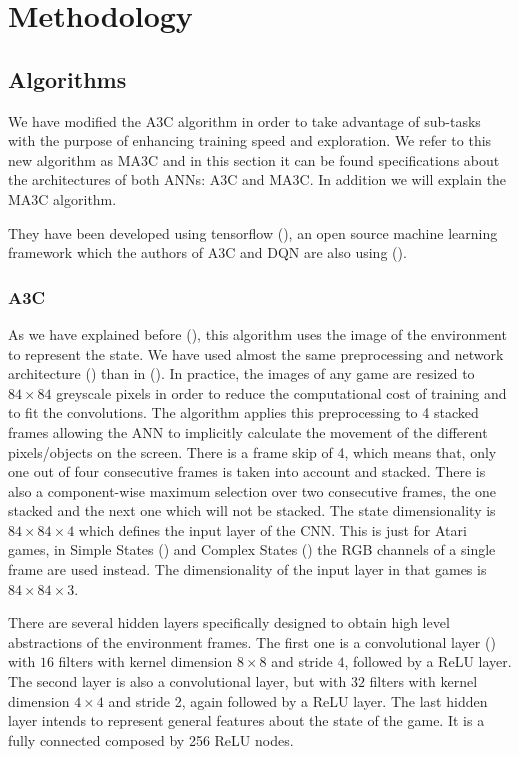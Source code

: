 \chapter{Methodology}

\section{Algorithms}

We have modified the \ac{A3C} algorithm in order to take advantage of sub-tasks with the purpose of enhancing training speed
and exploration.
We refer to this new algorithm as \acf{MA3C} and in this section it can be found specifications about the architectures of
both \acp{ANN}: \ac{A3C} and \ac{MA3C}.
In addition we will explain the \ac{MA3C} algorithm.

They have been developed using tensorflow (\cite{tensorflow2015}), an open source machine learning framework which the authors
of \ac{A3C} and \ac{DQN} are also using (\cite{deepmind_tensorflow}).

\subsection{\acl{A3C}\label{subsec:AlgorithmA3C}}

As we have explained before (), this algorithm uses the image of the environment to represent the state.
We have used almost the same preprocessing and network architecture () than in  (\cite{mnih2016A3C}).
In practice, the images of any game are resized to $84 \times 84$ greyscale pixels in order to reduce the computational cost of training and to fit the convolutions.
The algorithm applies this preprocessing to 4 stacked frames allowing the \ac{ANN} to implicitly calculate the movement
of the different pixels/objects on the screen.
There is a frame skip of 4, which means that, only one out of four consecutive frames is taken into account and stacked.
There is also a component-wise maximum selection over two consecutive frames, the one stacked and the next one which will
not be stacked.
The state dimensionality is $84 \times 84 \times 4$ which defines the input layer of the \ac{CNN}.
This is just for Atari games, in Simple States () and Complex States ()
the RGB channels of a single frame are used instead.
The dimensionality of the input layer in that games is $84 \times 84 \times 3$.

There are several hidden layers specifically designed to obtain high level abstractions of the environment frames.
The first one is a convolutional layer () with $16$ filters with kernel dimension $8 \times 8$ and stride $4$,
followed by a \ac{ReLU} layer.
The second layer is also a convolutional layer, but with $32$ filters with kernel dimension $4 \times 4$ and stride 2,
again followed by a \ac{ReLU} layer.
The last hidden layer intends to represent general features about the state of the game.
It is a fully connected composed by 256 ReLU nodes.

